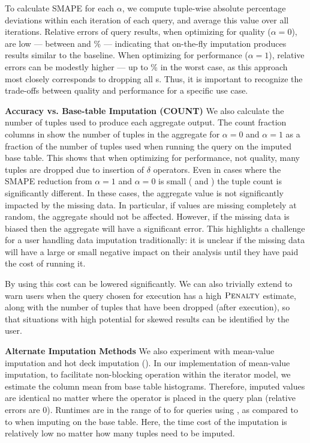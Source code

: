 {To calculate SMAPE for each $\alpha$,
we compute tuple-wise absolute percentage deviations within each iteration of each query, and
average this value over all iterations.
Relative errors of query results, when optimizing for quality
($\alpha=0$), are low --- between \lowsmapealphazero{} and
\highsmapealphazero{}\% --- indicating that on-the-fly imputation produces
results similar to the baseline. When optimizing for performance ($\alpha=1$),
relative errors can be modestly higher --- up to \highsmapealphaone{}\% in the
worst case, as this approach most closely corresponds to dropping all
\nullv{}s. Thus, it is important to recognize the trade-offs between quality and
performance for a specific use case.

\textbf{Accuracy vs. Base-table Imputation (COUNT)}\quad
We also calculate the number of tuples used to produce each aggregate output.
The count fraction columns in  show the number of tuples in the aggregate for $\alpha = 0$ and $\alpha = 1$ as a fraction of the number of tuples used when running the query on the imputed base table.
This shows that when optimizing for performance, not quality, many tuples are dropped due to
insertion of $\delta$ operators.
Even in cases where the SMAPE reduction from $\alpha = 1$ and $\alpha = 0$ is small
( and ) the tuple count is significantly different.
In these cases, the aggregate value is not significantly impacted by the missing data. In
particular, if values are missing completely at random,
the aggregate should not be affected.
However, if the missing data is biased then the aggregate will have a significant error.
This highlights a challenge for a user handling data imputation traditionally: it is unclear if the missing data will have a large or small negative impact on their analysis until they have paid the cost of running it.

By using \ProjectName{} this cost can be lowered significantly. We can also trivially extend \ProjectName{} to warn users when the query chosen for execution has a high
$\textsc{Penalty}$ estimate, along with the number of tuples that have been dropped (after execution), so that situations with high potential for skewed results can be identified by the user.

\textbf{Alternate Imputation Methods}\quad
We also experiment with mean-value imputation and hot deck imputation
(). In our implementation of mean-value imputation, to facilitate
non-blocking operation within the iterator model, we estimate the column mean from base
table histograms. Therefore, imputed values are identical no matter where the operator is
placed in the query plan (relative errors are $0$). Runtimes are in the range of
\runtimemeanlow{} to \runtimemeanhigh{} for queries using \ProjectName{}, as compared to
\runtimemeanlowbase{} to \runtimemeanhighbase{} when imputing on the base table.  Here, the
time cost of the imputation is relatively low no matter how many tuples need to be imputed.  

}
